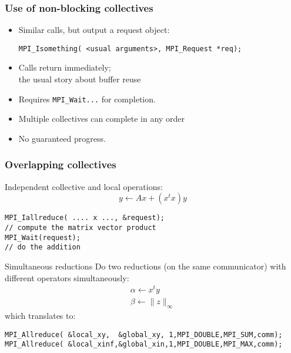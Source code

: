 \begin{frame}[containsverbatim]\frametitle{Use of non-blocking collectives}
  \label{sl:coll-nonblock-use}
  \begin{itemize}
  \item Similar calls, but output a request object:
\begin{lstlisting}
MPI_Isomething( <usual arguments>, MPI_Request *req);
\end{lstlisting}
  \item Calls return immediately;\\
    the usual story about buffer reuse
  \item Requires \lstinline{MPI_Wait}\texttt{...} for completion.
  \item Multiple collectives can complete in any order
  \item No guaranteed progress.
  \end{itemize}
\end{frame}


\begin{frame}[containsverbatim]\frametitle{Overlapping collectives}
  \label{sl:coll-nonblock-overlap}
  Independent collective and local operations:
\[ y \leftarrow Ax + (x^tx)y \]
\begin{lstlisting}
MPI_Iallreduce( .... x ..., &request);
// compute the matrix vector product
MPI_Wait(request);
// do the addition
\end{lstlisting}
\end{frame}

\begin{frame}[containsverbatim]{Simultaneous reductions}
  \label{sl:coll-nonblock-simult}
  Do two reductions (on the same communicator) with different
  operators simultaneously:
  \[ 
  \begin{array}{l}
    \alpha\leftarrow x^ty\\
    \beta\leftarrow \|z\|_\infty
  \end{array}
  \]
which translates to:
\begin{lstlisting}
MPI_Allreduce( &local_xy,  &global_xy, 1,MPI_DOUBLE,MPI_SUM,comm);
MPI_Allreduce( &local_xinf,&global_xin,1,MPI_DOUBLE,MPI_MAX,comm);
\end{lstlisting}
\end{frame}

\begin{exerciseframe}[procgridnonblock]
  \label{sl:coll-nonblock-exgrid}
  \hyperlink{ex:rowcolcomm}{}

  
\end{exerciseframe}

